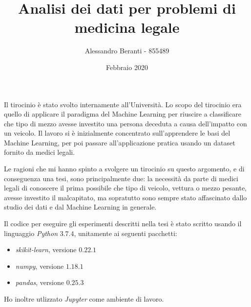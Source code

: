 \documentclass[12pt]{article}
\begin{document}
\title{{\Large
\textbf{\textmd{Analisi dei dati per problemi di medicina legale}}}}

\author{Alessandro Beranti - 855489}

\date{Febbraio 2020}

\maketitle

\vspace{1cm}

Il tirocinio è stato svolto internamente all'Università. 
Lo scopo del tirocinio era quello di applicare il paradigma del Machine Learning per riuscire a classificare che tipo di mezzo avesse investito una persona deceduta a causa dell'impatto con un veicolo. Il lavoro si è inizialmente concentrato sull'apprendere le basi del Machine Learning, per poi passare all'applicazione pratica usando un dataset fornito da medici legali.

Le ragioni che mi hanno spinto a svolgere un tirocinio su questo argomento, e di conseguenza una tesi, sono principalmente due: la necessità da parte di medici legali di conoscere il prima possibile che tipo di veicolo, vettura o mezzo pesante, avesse investito il malcapitato, ma sopratutto sono sempre stato affascinato dallo studio dei dati e dal Machine Learning in generale.

Il codice per eseguire gli esperimenti descritti nella tesi è stato scritto usando il linguaggio \emph{Python} $3.7.4$, unitamente ai seguenti pacchetti:
\begin{itemize}
	\item \emph{skikit-learn}, versione $0.22.1$
	\item \emph{numpy}, versione $1.18.1$
	\item \emph{pandas}, versione $0.25.3$
\end{itemize} 
Ho inoltre utlizzato \emph{Jupyter} come ambiente di lavoro.
\end{document}
